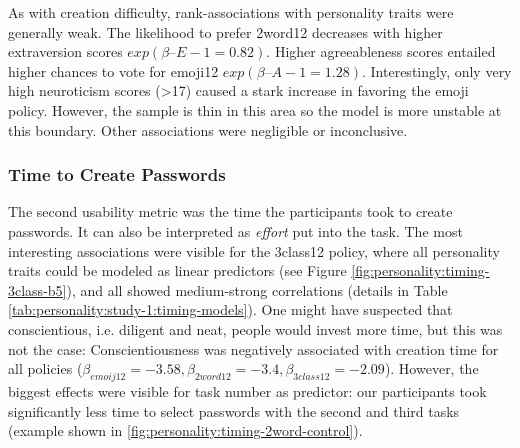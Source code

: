 As with creation difficulty, rank-associations with personality traits were generally weak. The likelihood to prefer 2word12 decreases with higher extraversion scores $exp(\beta–{E-1}=0.82)$. Higher agreeableness scores entailed higher chances to vote for emoji12 $exp(\beta–{A-1}=1.28)$. Interestingly, only very high neuroticism scores (>17) caused a  stark increase in favoring the emoji policy. However, the sample is thin in this area so the model is more unstable at this boundary. Other associations were negligible or inconclusive. 




\subsubsection{Time to Create Passwords}
The second usability metric was the time the participants took to create passwords. It can also be interpreted as \textit{effort} put into the task. The most interesting associations were visible for the 3class12 policy, where all personality traits could be modeled as linear predictors (see Figure \ref{fig:personality:timing-3class-b5}), and all showed medium-strong correlations (details in Table \ref{tab:personality:study-1:timing-models}). One might have suspected that conscientious, i.e. diligent and neat, people would invest more time, but this was not the case: Conscientiousness was negatively associated with creation time for all policies ($\beta_{emoij12}=-3.58,\beta_{2word12}=-3.4,\beta_{3class12}=-2.09$). However, the biggest effects were visible for task number as predictor: our participants took significantly less time to select passwords with the second and third tasks (example shown in \ref{fig:personality:timing-2word-control}). 


